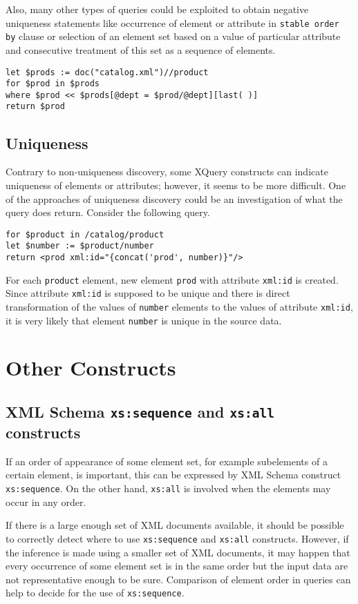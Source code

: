 Also, many other types of queries could be exploited to obtain negative uniqueness statements like occurrence of element or attribute in \texttt{stable order by} clause or selection of an element set based on a value of particular attribute and consecutive treatment of this set as a sequence of elements.

\begin{verbatim}
let $prods := doc("catalog.xml")//product 
for $prod in $prods 
where $prod << $prods[@dept = $prod/@dept][last( )] 
return $prod 
\end{verbatim}

\subsection{Uniqueness}
Contrary to non-uniqueness discovery, some XQuery constructs can indicate uniqueness of elements or attributes; however, it seems to be more difficult. One of the approaches of uniqueness discovery could be an investigation of what the query does return. Consider the following query.

\begin{verbatim}
for $product in /catalog/product
let $number := $product/number
return <prod xml:id="{concat('prod', number)}"/>
\end{verbatim}

For each \texttt{product} element, new element \texttt{prod} with attribute \texttt{xml:id} is created. Since attribute \texttt{xml:id} is supposed to be unique and there is direct transformation of the values of \texttt{number} elements to the values of attribute \texttt{xml:id}, it is very likely that element \texttt{number} is unique in the source data.

\section{Other Constructs}

\subsection{XML Schema \texttt{xs:sequence} and \texttt{xs:all} constructs}
If an order of appearance of some element set, for example subelements of a certain element, is important, this can be expressed by XML Schema construct \texttt{xs:sequence}. On the other hand, \texttt{xs:all} is involved when the elements may occur in any order.

If there is a large enough set of XML documents available, it should be possible to correctly detect where to use \texttt{xs:sequence} and \texttt{xs:all} constructs. However, if the inference is made using a smaller set of XML documents, it may happen that every occurrence of some element set is in the same order but the input data are not representative enough to be sure. Comparison of element order in queries can help to decide for the use of \texttt{xs:sequence}.

